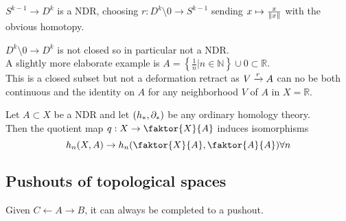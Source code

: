 \documentclass[../main.tex]{subfiles}
\begin{document}
\begin{exemple}
$S^{k-1}\to D^{k}$ is a NDR, choosing $r: D^{k}\setminus 0 \to S^{k-1}$ sending $x\mapsto \frac{x}{\left\lVert x\right\rVert}$ with the obvious homotopy.
\end{exemple}
\begin{exemple}
$D^{k}\setminus 0 \to D^{k}$ is not closed so in particular not a NDR.\\
A slightly more elaborate example is $ A= \left\{ \frac{1}{n}| n \in \mathbb{N} \right\} \cup 0 \subset \mathbb{R}$.\\
This is a closed subset but not a deformation retract as $V \xrightarrow{r} A$ can no be both continuous and the identity on $A$ for any neighborhood $V$ of $A$ in $X= \mathbb{R}$.
\end{exemple}
\begin{thm}
Let $A \subset X$ be a NDR and let $( h_\ast,\partial_\ast) $ be any ordinary homology theory.\\
Then the quotient map $q:X\to \faktor{X}{A}$ induces isomorphisms
\[ 
h_n( X,A) \to h_n( \faktor{X}{A}, \faktor{A}{A}) \forall n
\]
\end{thm}
\subsection{Pushouts of topological spaces}
\begin{propo}
Given $C \leftarrow A \rightarrow B$, it can always be completed to a pushout.
\end{propo}
\end{document}
